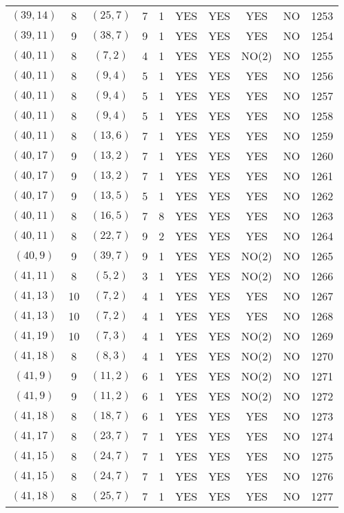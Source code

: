 \begin{longtable}{|c|c|c|c|c|c|c|c|c|c|}
$(39, 14)$ & 8 & $(25, 7)$ & 7 & 1 & YES & YES & YES & NO & 1253\\
$(39, 11)$ & 9 & $(38, 7)$ & 9 & 1 & YES & YES & YES & NO & 1254\\
$(40, 11)$ & 8 & $(7, 2)$ & 4 & 1 & YES & YES & NO(2) & NO & 1255\\
$(40, 11)$ & 8 & $(9, 4)$ & 5 & 1 & YES & YES & YES & NO & 1256\\
$(40, 11)$ & 8 & $(9, 4)$ & 5 & 1 & YES & YES & YES & NO & 1257\\
$(40, 11)$ & 8 & $(9, 4)$ & 5 & 1 & YES & YES & YES & NO & 1258\\
$(40, 11)$ & 8 & $(13, 6)$ & 7 & 1 & YES & YES & YES & NO & 1259\\
$(40, 17)$ & 9 & $(13, 2)$ & 7 & 1 & YES & YES & YES & NO & 1260\\
$(40, 17)$ & 9 & $(13, 2)$ & 7 & 1 & YES & YES & YES & NO & 1261\\
$(40, 17)$ & 9 & $(13, 5)$ & 5 & 1 & YES & YES & YES & NO & 1262\\
$(40, 11)$ & 8 & $(16, 5)$ & 7 & 8 & YES & YES & YES & NO & 1263\\
$(40, 11)$ & 8 & $(22, 7)$ & 9 & 2 & YES & YES & YES & NO & 1264\\
$(40, 9)$ & 9 & $(39, 7)$ & 9 & 1 & YES & YES & NO(2) & NO & 1265\\
$(41, 11)$ & 8 & $(5, 2)$ & 3 & 1 & YES & YES & NO(2) & NO & 1266\\
$(41, 13)$ & 10 & $(7, 2)$ & 4 & 1 & YES & YES & YES & NO & 1267\\
$(41, 13)$ & 10 & $(7, 2)$ & 4 & 1 & YES & YES & YES & NO & 1268\\
$(41, 19)$ & 10 & $(7, 3)$ & 4 & 1 & YES & YES & NO(2) & NO & 1269\\
$(41, 18)$ & 8 & $(8, 3)$ & 4 & 1 & YES & YES & NO(2) & NO & 1270\\
$(41, 9)$ & 9 & $(11, 2)$ & 6 & 1 & YES & YES & NO(2) & NO & 1271\\
$(41, 9)$ & 9 & $(11, 2)$ & 6 & 1 & YES & YES & NO(2) & NO & 1272\\
$(41, 18)$ & 8 & $(18, 7)$ & 6 & 1 & YES & YES & YES & NO & 1273\\
$(41, 17)$ & 8 & $(23, 7)$ & 7 & 1 & YES & YES & YES & NO & 1274\\
$(41, 15)$ & 8 & $(24, 7)$ & 7 & 1 & YES & YES & YES & NO & 1275\\
$(41, 15)$ & 8 & $(24, 7)$ & 7 & 1 & YES & YES & YES & NO & 1276\\
$(41, 18)$ & 8 & $(25, 7)$ & 7 & 1 & YES & YES & YES & NO & 1277\\

\end{longtable}
